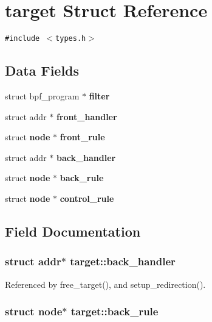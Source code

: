 \section{target Struct Reference}
\label{structtarget}
{\tt \#include $<$types.h$>$}

\subsection*{Data Fields}
\begin{CompactItemize}
\item 
struct bpf\_\-program $\ast$ {\bf filter}
\item 
struct addr $\ast$ {\bf front\_\-handler}
\item 
struct {\bf node} $\ast$ {\bf front\_\-rule}
\item 
struct addr $\ast$ {\bf back\_\-handler}
\item 
struct {\bf node} $\ast$ {\bf back\_\-rule}
\item 
struct {\bf node} $\ast$ {\bf control\_\-rule}
\end{CompactItemize}


\subsection{Field Documentation}
\subsubsection[{back\_\-handler}]{\setlength{\rightskip}{0pt plus 5cm}struct addr$\ast$ {\bf target::back\_\-handler}\hspace{0.3cm}{\tt  [read]}}\label{structtarget_942cbbe9f85bfe7305ac31e4ac534b1f}




Referenced by free\_\-target(), and setup\_\-redirection().
\subsubsection[{back\_\-rule}]{\setlength{\rightskip}{0pt plus 5cm}struct {\bf node}$\ast$ {\bf target::back\_\-rule}\hspace{0.3cm}{\tt  [read]}}\label{structtarget_b91ae0f849710e1f3f714a164197b422}




